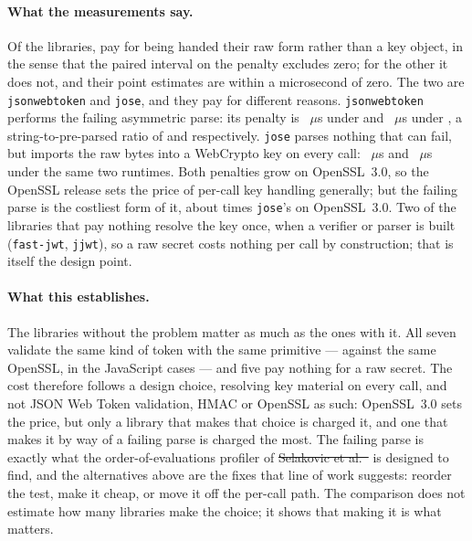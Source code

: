 \documentclass[pdflatex,sn-basic,twocolumn]{sn-jnl}%
\newcommand{\LibraryName}{\texttt{jsonwebtoken}}
\providecommand{\DIFdel}[1]{{\protect\color{red}\sout{#1}}}                      %
\providecommand{\DIFaddbegin}{} %
\providecommand{\DIFaddend}{} %
\providecommand{\DIFdelbegin}{} %
\providecommand{\DIFdelend}{} %
\newcommand{\DIFscaledelfig}{0.5}
\newlength{\DIFdelgraphicswidth} %
\newlength{\DIFdelgraphicsheight} %
\newcommand{\DIFaddincludegraphics}[2][]{{\color{blue}\fbox{\DIFOincludegraphics[#1]{#2}}}} %
\newcommand{\DIFdelincludegraphics}[2][]{%
\sbox{\DIFdelgraphicsbox}{\DIFOincludegraphics[#1]{#2}}%
\settoboxwidth{\DIFdelgraphicswidth}{\DIFdelgraphicsbox} %
\settoboxtotalheight{\DIFdelgraphicsheight}{\DIFdelgraphicsbox} %
\scalebox{\DIFscaledelfig}{%
\parbox[b]{\DIFdelgraphicswidth}{\usebox{\DIFdelgraphicsbox}\\[-\baselineskip] \rule{\DIFdelgraphicswidth}{0em}}\llap{\resizebox{\DIFdelgraphicswidth}{\DIFdelgraphicsheight}{%
\setlength{\unitlength}{\DIFdelgraphicswidth}%
\begin{picture}(1,1)%
\thicklines\linethickness{2pt} %
{\color[rgb]{1,0,0}\put(0,0){\framebox(1,1){}}}%
{\color[rgb]{1,0,0}\put(0,0){\line( 1,1){1}}}%
{\color[rgb]{1,0,0}\put(0,1){\line(1,-1){1}}}%
\end{picture}%
}\hspace*{3pt}}} %
} %
\DeclareRobustCommand{\DIFaddbegin}{\DIFOaddbegin \let\includegraphics\DIFaddincludegraphics} %
\DeclareRobustCommand{\DIFaddend}{\DIFOaddend \let\includegraphics\DIFOincludegraphics} %
\DeclareRobustCommand{\DIFdelbegin}{\DIFOdelbegin \let\includegraphics\DIFdelincludegraphics} %
\DeclareRobustCommand{\DIFdelend}{\DIFOaddend \let\includegraphics\DIFOincludegraphics} %
\begin{document}
\paragraph{What the measurements say.} Of the \XlibLibCount{} libraries,
\XlibPenaltyLibCount{} pay for being handed their raw form rather than a key
object, in the sense that the paired interval on the penalty excludes zero; for
the other \XlibZeroPenaltyLibCount{} it does not, and their point estimates are
within a microsecond of zero. The two are \LibraryName{} and \texttt{jose}, and
they pay for different reasons. \LibraryName{} performs the failing asymmetric
parse: its penalty is \XlibJsonwebtokenOldSslPenalty~$\mu$s under
\XlibJsonwebtokenOldSslBackend{} and \XlibJsonwebtokenNewSslPenalty~$\mu$s under
\XlibJsonwebtokenNewSslBackend, a string-to-pre-parsed ratio of
\XlibJsonwebtokenOldSslRatio{} and \XlibJsonwebtokenNewSslRatio{}
respectively. \texttt{jose} parses nothing that can fail, but imports the raw
bytes into a WebCrypto key on every call: \XlibJoseOldSslPenalty~$\mu$s and
\XlibJoseNewSslPenalty~$\mu$s under the same two runtimes. Both penalties grow
on OpenSSL~3.0, so the OpenSSL release sets the price of per-call key handling
generally; but the failing parse is the costliest form of it, about
\XlibJwtOverJoseOldSsl{} times \texttt{jose}'s on OpenSSL~3.0. Two of the
libraries that pay nothing resolve the key once, when a verifier or parser is
built (\texttt{fast-jwt}, \texttt{jjwt}), so a raw secret costs nothing per
call by construction; that is itself the design point.

\paragraph{What this establishes.} The libraries without the problem matter as
much as the ones with it. All seven validate the same kind of token with the
same primitive --- against the same OpenSSL, in the JavaScript cases --- and
five pay nothing for a raw secret. The cost therefore follows a design choice,
resolving key material on every call, and not JSON Web Token validation, HMAC
or OpenSSL as such: OpenSSL~3.0 sets the price, but only a library that makes
that choice is charged it, and one that makes it by way of a failing parse is
charged the most. The failing parse is exactly what the order-of-evaluations
profiler of \DIFdelbegin \DIFdel{Selakovic et al.~}%
\DIFdelend \DIFaddbegin \citet{selakovic2017actionable} \DIFaddend is designed to
find, and the alternatives above are the fixes that line of work suggests:
reorder the test, make it cheap, or move it off the per-call path. The
comparison does not estimate how many libraries make the choice; it shows that
making it is what matters.
\end{document}
